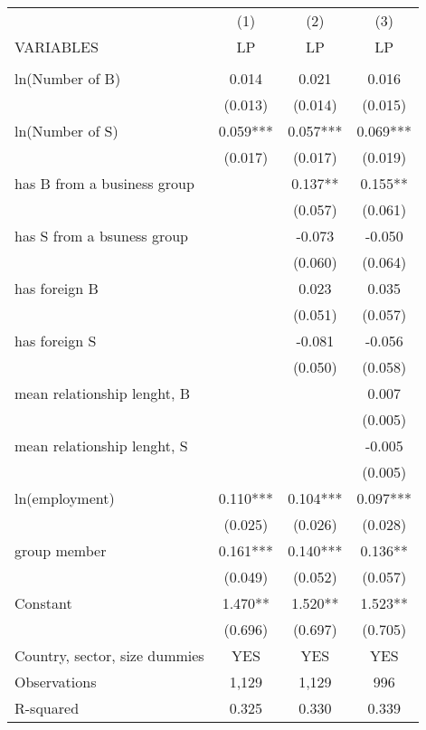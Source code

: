 
\begin{tabular}{lccc} \hline
 & (1) & (2) & (3) \\
VARIABLES & LP & LP & LP \\ \hline
 &  &  &  \\
ln(Number of B) & 0.014 & 0.021 & 0.016 \\
 & (0.013) & (0.014) & (0.015) \\
ln(Number of S) & 0.059*** & 0.057*** & 0.069*** \\
 & (0.017) & (0.017) & (0.019) \\
has B from a business group &  & 0.137** & 0.155** \\
 &  & (0.057) & (0.061) \\
has S from a bsuness group &  & -0.073 & -0.050 \\
 &  & (0.060) & (0.064) \\
has foreign B &  & 0.023 & 0.035 \\
 &  & (0.051) & (0.057) \\
has foreign S &  & -0.081 & -0.056 \\
 &  & (0.050) & (0.058) \\
mean relationship lenght, B &  &  & 0.007 \\
 &  &  & (0.005) \\
mean relationship lenght, S &  &  & -0.005 \\
 &  &  & (0.005) \\
ln(employment) & 0.110*** & 0.104*** & 0.097*** \\
 & (0.025) & (0.026) & (0.028) \\
group member & 0.161*** & 0.140*** & 0.136** \\
 & (0.049) & (0.052) & (0.057) \\
Constant & 1.470** & 1.520** & 1.523** \\
 & (0.696) & (0.697) & (0.705) \\\hline
Country, sector, size dummies &YES &YES &YES\\
Observations & 1,129 & 1,129 & 996 \\
 R-squared & 0.325 & 0.330 & 0.339 \\ \hline
\end{tabular}

